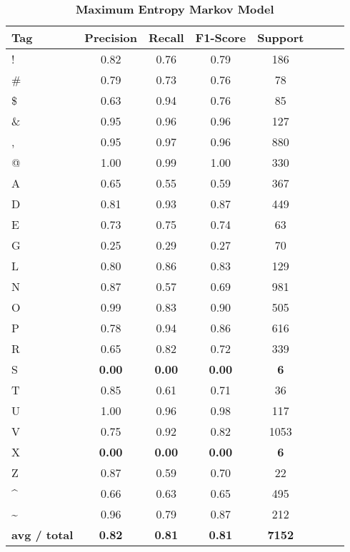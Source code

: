 \documentclass[11pt]{article}
\begin{document}
\begin{table}[htbp]
\centering
\begin{tabular}{l*{6}{c}r}
Tag              & Precision & Recall & F1-Score & Support \\
\hline
          !   &    0.82   &   0.76   &   0.79    &   186 \\
          \#    &   0.79   &   0.73  &    0.76    &    78 \\
          \$    &   0.63   &   0.94    &  0.76     &   85 \\
          \&    &   0.95  &    0.96    &  0.96    &   127 \\
          ,    &   0.95  &    0.97  &    0.96   &    880 \\
          @   &    1.00   &   0.99   &   1.00  &     330 \\
          A   &    0.65   &   0.55   &   0.59   &    367 \\
          D   &    0.81   &   0.93  &    0.87    &   449 \\
          E    &   0.73   &   0.75  &    0.74    &    63 \\
          G    &   0.25   &   0.29  &    0.27    &    70 \\
          L   &    0.80   &   0.86  &    0.83     &  129 \\
          N     &  0.87   &   0.57   &   0.69     &  981 \\
          O  &     0.99   &   0.83   &   0.90  &     505 \\
          P    &   0.78   &   0.94   &   0.86   &    616 \\
          R   &    0.65    &  0.82  &    0.72   &    339 \\
          S   &    \textbf{0.00 }  &   \textbf{0.00}   &  \textbf{ 0.00 }   &     \textbf{6} \\
          T   &    0.85   &   0.61   &   0.71   &     36 \\
          U    &   1.00   &   0.96  &    0.98    &   117 \\
          V    &   0.75  &    0.92   &   0.82    &  1053 \\
          X    &   \textbf{0.00}    &  \textbf{0.00}    &  \textbf{0.00}    &     \textbf{6} \\
          Z     &  0.87   &   0.59  &    0.70    &    22 \\
          \textasciicircum  &    0.66  &    0.63  &    0.65   &    495 \\
          \textasciitilde   &    0.96   &   0.79  &    0.87     &  212 \\

\textbf{avg / total}  &    \textbf{ 0.82 } &    \textbf{0.81}     & \textbf{0.81}  &    \textbf{7152} \\

          \end{tabular}
       \caption{ \textbf{Maximum Entropy Markov Model }}
\label{table2}
\end{table}



\newpage
\nocite{*}


\end{document}
